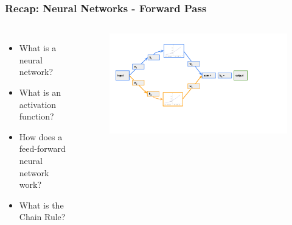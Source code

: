 \documentclass[aspectratio=169]{beamer}
\newcommand{\myblue}[1]{{\color{blue}{#1}}}
\begin{document}
\begin{frame}[fragile]\frametitle{Recap: Neural Networks - Forward Pass}
\myblue{What did we talk about last?}
\begin{columns}
        \begin{itemize}
            \item What is a neural network?
            \item What is an activation function?
            \item How does a feed-forward neural network work?
            \item What is the Chain Rule?
        \end{itemize}
        \begin{figure}
        \centering
        \includegraphics[trim={1cm 3cm 5cm 0.35cm },clip,width=\linewidth]{BP_4}
        \end{figure}
\end{columns}
\end{frame}
\end{document}
